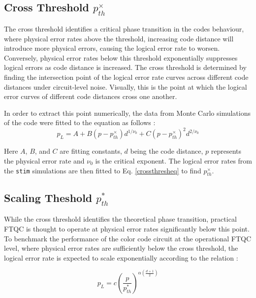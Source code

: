 \subsection{Cross Threshold $p^\times_{th}$}
The cross threshold identifies a critical phase transition in the codes behaviour, where physical error rates above the threshold, increasing code distance will introduce more physical errors, causing the logical error rate to worsen. Conversely, physical error rates below this threshold exponentially suppresses logical errors as code distance is increased.
The cross threshold is determined by finding the intersection point of the logical error rate curves across different code distances under circuit-level noise. Visually, this is the point at which the logical error curves of different code distances cross one another. 

In order to extract this point numerically, the data from Monte Carlo simulations of the code were fitted to the equation as follows \cite{landahl2011faulttolerantquantumcomputingcolor, wangHarringtonPreskill}:
\begin{equation}
\label{crossthresheq}
    p_L = A + B(p - p^{\times}_{th}) d^{1/\nu_0} + C(p - p^\times_{th})^2 d^{2/\nu_0}
\end{equation}

Here $A$, $B$, and $C$ are fitting constants, $d$ being the code distance, $p$ represents the physical error rate and $\nu_0$ is the critical exponent. The logical error rates from the \texttt{stim} simulations are then fitted to Eq. \ref{crossthresheq} to find $p^\times_{th}$.

\subsection{Scaling Theshold $p^*_{th}$}
While the cross threshold identifies the theoretical phase transition, practical FTQC is thought to operate at physical error rates significantly below this point. To benchmark the performance of the color code circuit at the operational FTQC level, where physical error rates are sufficiently below the cross threshold, the logical error rate is expected to scale exponentially according to the relation \cite{surfacecodesFowler, flaggedweightcolorcode}:

\begin{equation}
\label{scalethresheq}
    p_L = c\left( \frac{p}{p^*_{th}}\right)^{\alpha\left(\frac{d+1}{2}\right)}
\end{equation}

